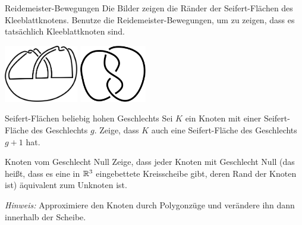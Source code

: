 \documentclass{pizzablatt}
\begin{document}
\begin{aufgabe}{Reidemeister-Bewegungen}
Die Bilder zeigen die Ränder der Seifert-Flächen des
Kleeblattknotens. Benutze die Reidemeister-Bewegungen, um zu zeigen, dass es
tatsächlich Kleeblattknoten sind.

\begin{center}
\includegraphics[height=94px]{Kleeblatt1}
\hspace{3em}
\includegraphics[height=94px]{Kleeblatt2}
\end{center}
\end{aufgabe}

\begin{aufgabe}{Seifert-Flächen beliebig hohen Geschlechts}
Sei $K$ ein Knoten mit einer Seifert-Fläche des Geschlechts $g$. Zeige, dass
$K$ auch eine Seifert-Fläche des Geschlechts $g+1$ hat.
\end{aufgabe}

\begin{aufgabe}{Knoten vom Geschlecht Null}
Zeige, dass jeder Knoten mit Geschlecht Null (das heißt, dass es eine in $\mathbb{R}^3$
eingebettete Kreisscheibe gibt, deren Rand der Knoten ist) äquivalent zum Unknoten
ist. 

\emph{Hinweis:} Approximiere den Knoten durch Polygonzüge und verändere ihn
dann innerhalb der Scheibe.
\end{aufgabe}
\end{document}
